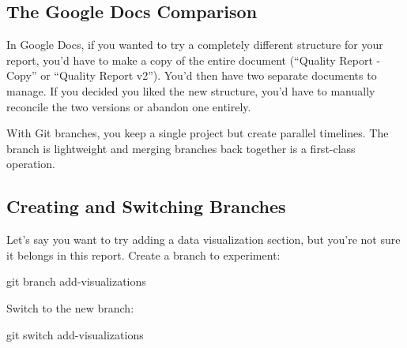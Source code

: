 \documentclass[
  letterpaper,
  DIV=11,
  numbers=noendperiod]{scrreprt}
\newenvironment{Shaded}{\begin{snugshade}}{\end{snugshade}}
\newcommand{\FunctionTok}[1]{\textcolor[rgb]{0.28,0.35,0.67}{#1}}
\newcommand{\NormalTok}[1]{\textcolor[rgb]{0.00,0.23,0.31}{#1}}
\begin{document}
\subsection{The Google Docs
Comparison}\label{the-google-docs-comparison}

In Google Docs, if you wanted to try a completely different structure
for your report, you'd have to make a copy of the entire document
(``Quality Report - Copy'' or ``Quality Report v2''). You'd then have
two separate documents to manage. If you decided you liked the new
structure, you'd have to manually reconcile the two versions or abandon
one entirely.

With Git branches, you keep a single project but create parallel
timelines. The branch is lightweight and merging branches back together
is a first-class operation.

\subsection{Creating and Switching
Branches}\label{creating-and-switching-branches}

Let's say you want to try adding a data visualization section, but
you're not sure it belongs in this report. Create a branch to
experiment:

\begin{codelisting}

\caption{\texttt{terminal}}

\begin{Shaded}
\begin{Highlighting}[]
\FunctionTok{git}\NormalTok{ branch add{-}visualizations}
\end{Highlighting}
\end{Shaded}

\end{codelisting}

Switch to the new branch:

\begin{codelisting}

\caption{\texttt{terminal}}

\begin{Shaded}
\begin{Highlighting}[]
\FunctionTok{git}\NormalTok{ switch add{-}visualizations}
\end{Highlighting}
\end{Shaded}

\end{codelisting}
\end{document}

